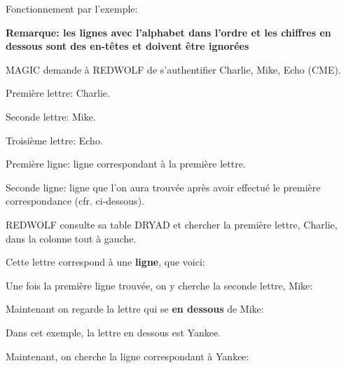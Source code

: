 Fonctionnement par l'exemple:
\begin{e1}
	
	\item \textbf{Remarque: les lignes avec l'alphabet dans l'ordre et les chiffres en dessous sont des en-têtes et doivent être ignorées}
	

	\item 
	
	MAGIC demande à REDWOLF de s'authentifier Charlie, Mike, Echo (CME).
	
	\begin{e2}
			\begin{e3}
				\item Première lettre: Charlie.
				\item Seconde lettre: Mike.
				\item Troisième lettre: Echo.
				\item Première ligne: ligne correspondant à la première lettre.
				\item Seconde ligne: ligne que l'on aura trouvée après avoir effectué le première correspondance (cfr. ci-dessous).
			\end{e3}
	\end{e2}
	
	REDWOLF consulte sa table DRYAD et chercher la première lettre, Charlie, dans la colonne tout à gauche.
	
	Cette lettre correspond à une \textbf{ligne}, que voici:
	
	
	\item Une fois la première ligne trouvée, on y cherche la seconde lettre, Mike:
	
	
	\item Maintenant on regarde la lettre qui se \textbf{en dessous} de Mike:
	
	
	Dans cet exemple, la lettre en dessous est Yankee.
	
	\item Maintenant, on cherche la ligne correspondant à Yankee:
	

\end{e1}
